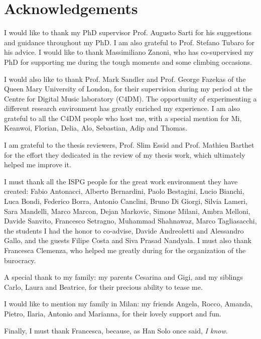 \chapter*{Acknowledgements}
I would like to thank my PhD supervisor Prof. Augusto Sarti for his suggestions and guidance throughout my PhD. I am also grateful to Prof. Stefano Tubaro for his advice. I would like to thank Massimiliano Zanoni, who has co-supervised my PhD for supporting me during the tough moments and some climbing occasions.

I would also like to thank Prof. Mark Sandler and Prof. George Fazekas of the Queen Mary University of London, for their supervision during my period at the Centre for Digital Music laboratory (C4DM). The opportunity of experimenting a different research environment has greatly enriched my experience. I am also grateful to all the C4DM people who host me, with a special mention for Mi, Keanwoi, Florian, Delia, Alo, Sebastian, Adip and Thomas. 

I am grateful to the thesis reviewers, Prof. Slim Essid and Prof. Mathieu Barthet for the effort they dedicated in the review of my thesis work, which ultimately helped me improve it.

I must thank all the ISPG people for the great work environment they have created: Fabio Antonacci, Alberto Bernardini, Paolo Bestagini, Lucio Bianchi, Luca Bondi, Federico Borra, Antonio Canclini, Bruno Di Giorgi, Silvia Lameri,  Sara Mandelli, Marco Marcon, Dejan Markovic,  Simone Milani, Ambra Melloni,  Davide Sanvito,  Francesco Setragno, Muhammad Shahnawaz, Marco Tagliasacchi, the students I had the honor to co-advise, Davide Andreoletti and Alessandro Gallo, and the guests Filipe Costa and Siva Prasad Nandyala.
I must also thank Francesca Clemenza, who helped me greatly during for the organization of the burocracy.  

A special thank to my family: my parents Cesarina and Gigi, and my siblings Carlo, Laura and Beatrice, for their precious ability to tease me.

I would like to mention my family in Milan: my friends Angela, Rocco, Amanda, Pietro, Ilaria, Antonio and Marianna, for their lovely support and fun. 

Finally, I must thank Francesca, because, as Han Solo once said, \textit{I know}.


